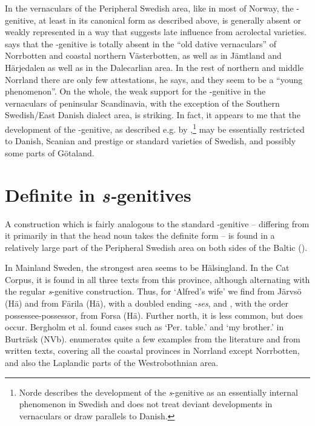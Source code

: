In the vernaculars of the Peripheral Swedish area, like in most of Norway, the -genitive, at least in its canonical form as described above, is generally absent or weakly represented in a way that suggests late influence from acrolectal varieties. \citet[41]{Delsing2003a} says that the -genitive is totally absent in the “old dative vernaculars” of Norrbotten and coastal northern Västerbotten, as well as in Jämtland and Härjedalen as well as in the Dalecarlian area. In the rest of northern and middle Norrland there are only few attestations, he says, and they seem to be a “young phenomenon”. On the whole, the weak support for the -genitive in the vernaculars of peninsular Scandinavia, with the exception of the Southern Swedish/East Danish dialect area, is striking. In fact, it appears to me that the development of the -genitive, as described e.g. by \citet{Norde1997},\footnote{ Norde describes the development of the \textit{s}{}-genitive as an essentially internal phenomenon in Swedish and does not treat deviant developments in vernaculars or draw parallels to Danish.} may be essentially restricted to Danish, Scanian and prestige or standard varieties of Swedish, and possibly some parts of Götaland. 

\section{Definite in \textit{s-}genitives}
\label{sec:5.3}

A construction which is fairly analogous to the standard -genitive – differing from it primarily in that the head noun takes the definite form – is found in a relatively large part of the Peripheral Swedish area on both sides of the Baltic (\citet[27]{Delsing2003a}).

In Mainland Sweden, the strongest area seems to be Hälsingland. In the Cat Corpus, it is found in all three texts from this province, although alternating with the regular \textit{s}{}-genitive construction. Thus, for ‘Alfred’s wife’ we find  from Järvsö (Hä) and  from Färila (Hä), with a doubled ending\textit{ {}-ses}, and , with the order possessee-possessor, from Forsa (Hä). Further north, it is less common, but does occur.  Bergholm et al. found cases such as ‘Per.{\gen} table.{}’ and  ‘my brother.{}’ in Burträsk (NVb). \citet[27]{Delsing2003a} enumerates quite a few examples from the literature and from written texts, covering all the coastal provinces in Norrland except Norrbotten, and also the Laplandic parts of the Westrobothnian area. 

